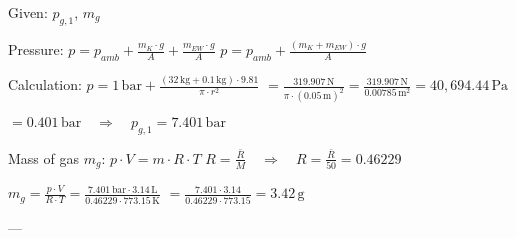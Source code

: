 Given: \( p_{g,1} \), \( m_{g} \)  

Pressure:  
\( p = p_{amb} + \frac{m_K \cdot g}{A} + \frac{m_{EW} \cdot g}{A} \)  
\( p = p_{amb} + \frac{(m_K + m_{EW}) \cdot g}{A} \)  

Calculation:  
\( p = 1 \, \text{bar} + \frac{(32 \, \text{kg} + 0.1 \, \text{kg}) \cdot 9.81}{\pi \cdot r^2} \)  
\( = \frac{319.907 \, \text{N}}{\pi \cdot (0.05 \, \text{m})^2} = \frac{319.907 \, \text{N}}{0.00785 \, \text{m}^2} = 40,694.44 \, \text{Pa} \)  

\( = 0.401 \, \text{bar} \quad \Rightarrow \quad p_{g,1} = 7.401 \, \text{bar} \)  

Mass of gas \( m_g \):  
\( p \cdot V = m \cdot R \cdot T \)  
\( R = \frac{\bar{R}}{M} \quad \Rightarrow \quad R = \frac{\bar{R}}{50} = 0.46229 \)  

\( m_g = \frac{p \cdot V}{R \cdot T} = \frac{7.401 \, \text{bar} \cdot 3.14 \, \text{L}}{0.46229 \cdot 773.15 \, \text{K}} \)  
\( = \frac{7.401 \cdot 3.14}{0.46229 \cdot 773.15} = 3.42 \, \text{g} \)  

---